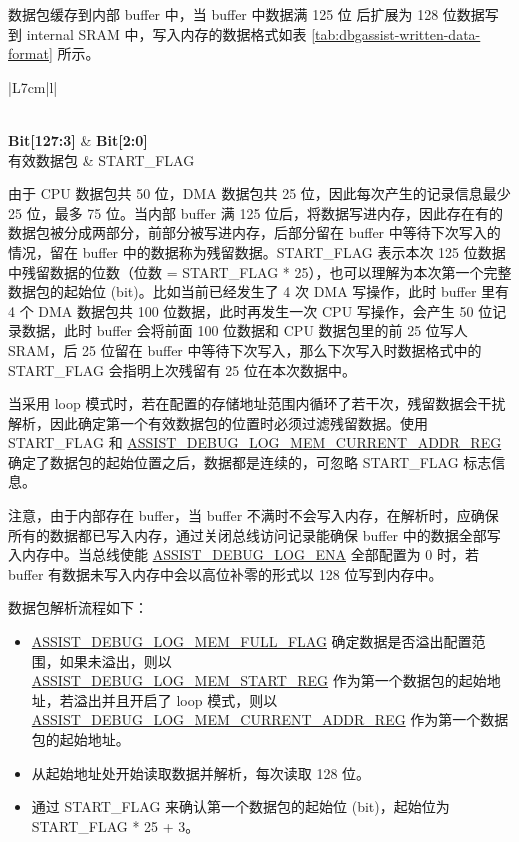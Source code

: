 \documentclass[main\_\_CN.tex]{subfiles}
\begin{document}
数据包缓存到内部 buffer 中，当 buffer 中数据满 125 位 后扩展为 128 位数据写到 internal SRAM 中，写入内存的数据格式如表 \ref{tab:dbgassist-written-data-format} 所示。
        
        \begin{longtable}[c]{|L{7cm}|l|}
        \caption{写内存数据格式}\label{tab:dbgassist-written-data-format}
        \\\hline
        {\bfseries Bit[127:3]} & {\bfseries Bit[2:0]} \\\hline
        有效数据包 & 
        START\_FLAG \\\hline
        \end{longtable}

由于 CPU 数据包共 50 位，DMA 数据包共 25 位，因此每次产生的记录信息最少 25 位，最多 75 位。当内部 buffer 满 125 位后，将数据写进内存，因此存在有的数据包被分成两部分，前部分被写进内存，后部分留在 buffer 中等待下次写入的情况，留在 buffer 中的数据称为残留数据。START\_FLAG 表示本次 125 位数据中残留数据的位数（位数 = START\_FLAG * 25），也可以理解为本次第一个完整数据包的起始位 (bit)。比如当前已经发生了 4 次 DMA 写操作，此时 buffer 里有 4 个 DMA 数据包共 100 位数据，此时再发生一次 CPU 写操作，会产生 50 位记录数据，此时 buffer 会将前面 100 位数据和 CPU 数据包里的前 25 位写人 SRAM，后 25 位留在 buffer 中等待下次写入，那么下次写入时数据格式中的 START\_FLAG 会指明上次残留有 25 位在本次数据中。

当采用 loop 模式时，若在配置的存储地址范围内循环了若干次，残留数据会干扰解析，因此确定第一个有效数据包的位置时必须过滤残留数据。使用 START\_FLAG 和 \hyperref[regdesc:ASSISTDEBUGLOGMEMCURRENTADDRREG]{ASSIST\_DEBUG\_LOG\_MEM\_CURRENT\_ADDR\_REG} 确定了数据包的起始位置之后，数据都是连续的，可忽略 START\_FLAG 标志信息。

注意，由于内部存在 buffer，当 buffer 不满时不会写入内存，在解析时，应确保所有的数据都已写入内存，通过关闭总线访问记录能确保 buffer 中的数据全部写入内存中。当总线使能 \hyperref[fielddesc:ASSISTDEBUGLOGENA]{ASSIST\_DEBUG\_LOG\_ENA} 全部配置为 0 时，若 buffer 有数据未写入内存中会以高位补零的形式以 128 位写到内存中。

数据包解析流程如下：

\begin{itemize}
    \item \hyperref[fielddesc:ASSISTDEBUGLOGMEMFULLFLAG]{
    \hyperref[fielddesc:ASSISTDEBUGLOGMEMFULLFLAG]{ASSIST\_DEBUG\_LOG\_MEM\_FULL\_FLAG}} 确定数据是否溢出配置范围，如果未溢出，则以\\ \hyperref[regdesc:ASSISTDEBUGLOGMEMSTARTREG]{ASSIST\_DEBUG\_LOG\_MEM\_START\_REG} 作为第一个数据包的起始地址，若溢出并且开启了 loop 模式，则以 
    \hyperref[regdesc:ASSISTDEBUGLOGMEMCURRENTADDRREG]{ASSIST\_DEBUG\_LOG\_MEM\_CURRENT\_ADDR\_REG}  作为第一个数据包的起始地址。
    
    \item 从起始地址处开始读取数据并解析，每次读取 128 位。
    
    \item 通过 START\_FLAG 来确认第一个数据包的起始位 (bit)，起始位为 START\_FLAG * 25 + 3。
\end{itemize}
\end{document}
